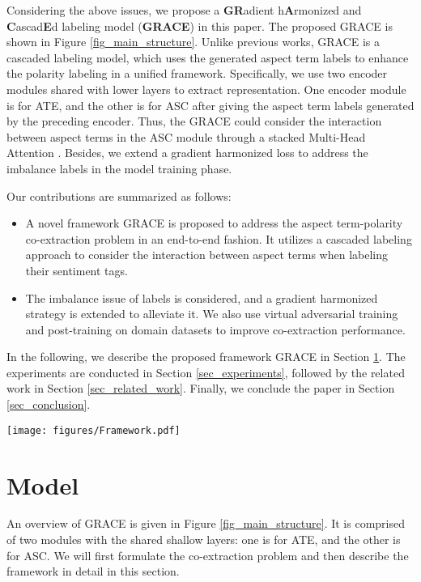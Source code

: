 \documentclass[11pt,a4paper]{article}
\begin{document}
Considering the above issues, we propose a \textbf{GR}adient h\textbf{A}rmonized and \textbf{C}ascad\textbf{E}d labeling model (\textbf{GRACE}) in this paper. The proposed GRACE is shown in Figure \ref{fig_main_structure}. Unlike previous works, GRACE is a cascaded labeling model, which uses the generated aspect term labels to enhance the polarity labeling in a unified framework. Specifically, we use two encoder modules shared with lower layers to extract representation. One encoder module is for ATE, and the other is for ASC after giving the aspect term labels generated by the preceding encoder. Thus, the GRACE could consider the interaction between aspect terms in the ASC module through a stacked Multi-Head Attention \cite{Vaswani2017}. Besides, we extend a gradient harmonized loss to address the imbalance labels in the model training phase.

Our contributions are summarized as follows:
\begin{itemize}
    \item A novel framework GRACE is proposed to address the aspect term-polarity co-extraction problem in an end-to-end fashion. It utilizes a cascaded labeling approach to consider the interaction between aspect terms when labeling their sentiment tags.
    \item The imbalance issue of labels is considered, and a gradient harmonized strategy is extended to alleviate it. We also use virtual adversarial training and post-training on domain datasets to improve co-extraction performance.
\end{itemize}
In the following, we describe the proposed framework GRACE in Section \ref{sec_model}. The experiments are conducted in Section \ref{sec_experiments}, followed by the related work in Section \ref{sec_related_work}. Finally, we conclude the paper in Section \ref{sec_conclusion}.
\begin{figure*}[tp] 
    \centering
    \texttt{[image: figures/Framework.pdf]} 
    \caption{The main structure of our \textbf{GRACE}. It is a cascaded labeling architecture, which means that the generated aspect term labels [O,B,I,O,B] are fed to the right part as key  and value  to generate sentiment labels [O,\texttt{POS},\texttt{POS},O,\texttt{POS}]. The perturbed embeddings  is added to the Token embeddings .}
    \label{fig_main_structure}
\end{figure*}

\section{Model}
\label{sec_model}
An overview of GRACE is given in Figure \ref{fig_main_structure}. It is comprised of two modules with the shared shallow layers: one is for ATE, and the other is for ASC. We will first formulate the co-extraction problem and then describe the framework in detail in this section.
\end{document}
